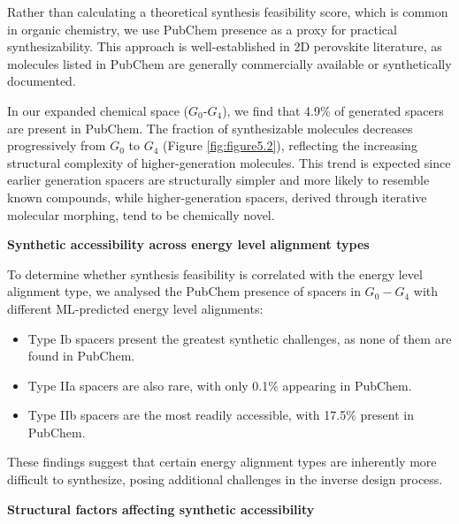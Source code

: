 Rather than calculating a theoretical synthesis feasibility score, which is common in organic chemistry, we use PubChem presence as a proxy for practical synthesizability. This approach is well-established in 2D perovskite literature\cite{RN315}, as molecules listed in PubChem are generally commercially available or synthetically documented.

In our expanded chemical space ($G_0$-$G_4$), we find that 4.9\% of generated spacers are present in PubChem. The fraction of synthesizable molecules decreases progressively from $G_0$ to $G_4$ (Figure \ref{fig:figure5.2}), reflecting the increasing structural complexity of higher-generation molecules. This trend is expected since earlier generation spacers are structurally simpler and more likely to resemble known compounds, while higher-generation spacers, derived through iterative molecular morphing, tend to be chemically novel.



\textbf{Synthetic accessibility across energy level alignment types}

To determine whether synthesis feasibility is correlated with the energy level alignment type, we analysed the PubChem presence of spacers in $G_0-G_4$ with different ML-predicted energy level alignments:
\begin{itemize}
    \item Type Ib spacers present the greatest synthetic challenges, as none of them are found in PubChem.
    \item Type IIa spacers are also rare, with only 0.1\% appearing in PubChem. 
    \item Type IIb spacers are the most readily accessible, with 17.5\% present in PubChem. 
\end{itemize}

These findings suggest that certain energy alignment types are inherently more difficult to synthesize, posing additional challenges in the inverse design process.

\textbf{Structural factors affecting synthetic accessibility}

